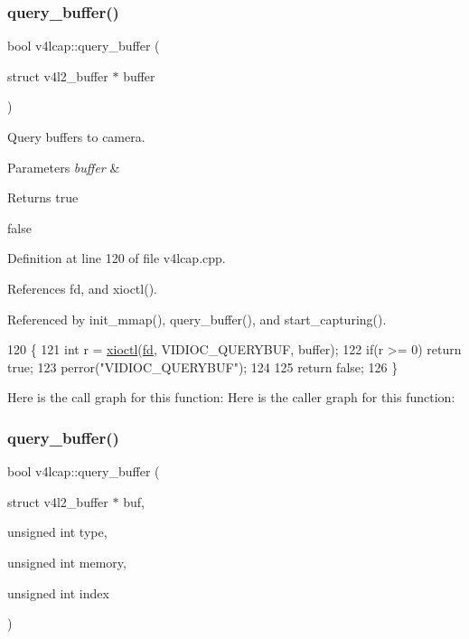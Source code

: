 \subsubsection{\texorpdfstring{query\+\_\+buffer()}{query\_buffer()}\hspace{0.1cm}{\footnotesize\ttfamily [1/3]}}
{\footnotesize\ttfamily bool v4lcap\+::query\+\_\+buffer (\begin{DoxyParamCaption}\item[{struct v4l2\+\_\+buffer $\ast$}]{buffer }\end{DoxyParamCaption})}



Query buffers to camera. 


\begin{DoxyParams}{Parameters}
{\em buffer} & \\
\hline
\end{DoxyParams}
\begin{DoxyReturn}{Returns}
true 

false 
\end{DoxyReturn}


Definition at line 120 of file v4lcap.\+cpp.



References fd, and xioctl().



Referenced by init\+\_\+mmap(), query\+\_\+buffer(), and start\+\_\+capturing().


\begin{DoxyCode}
120                                                      \{
121     \textcolor{keywordtype}{int} r = \hyperlink{classv4lcap_ab5aaa5a8c0df17f5ca57e0b5170232cb}{xioctl}(\hyperlink{classv4lcap_a38109593bde997dad13b3a461569573d}{fd}, VIDIOC\_QUERYBUF, buffer);
122     \textcolor{keywordflow}{if}(r >= 0) \textcolor{keywordflow}{return} \textcolor{keyword}{true};
123     perror(\textcolor{stringliteral}{"VIDIOC\_QUERYBUF"});
124 
125     \textcolor{keywordflow}{return} \textcolor{keyword}{false};
126 \}
\end{DoxyCode}
Here is the call graph for this function\+:
Here is the caller graph for this function\+:
\mbox{\label{classv4lcap_ad3cb2800d0606ec4ade6fd78f52a56cd}} 
\subsubsection{\texorpdfstring{query\+\_\+buffer()}{query\_buffer()}\hspace{0.1cm}{\footnotesize\ttfamily [2/3]}}
{\footnotesize\ttfamily bool v4lcap\+::query\+\_\+buffer (\begin{DoxyParamCaption}\item[{struct v4l2\+\_\+buffer $\ast$}]{buf,  }\item[{unsigned int}]{type,  }\item[{unsigned int}]{memory,  }\item[{unsigned int}]{index }\end{DoxyParamCaption})}



